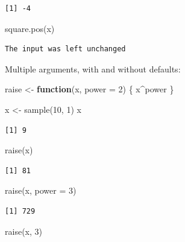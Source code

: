 \documentclass[
]{book}
\newenvironment{Shaded}{\begin{snugshade}}{\end{snugshade}}
\newcommand{\AttributeTok}[1]{\textcolor[rgb]{0.77,0.63,0.00}{#1}}
\newcommand{\ControlFlowTok}[1]{\textcolor[rgb]{0.13,0.29,0.53}{\textbf{#1}}}
\newcommand{\DecValTok}[1]{\textcolor[rgb]{0.00,0.00,0.81}{#1}}
\newcommand{\FunctionTok}[1]{\textcolor[rgb]{0.00,0.00,0.00}{#1}}
\newcommand{\NormalTok}[1]{#1}
\newcommand{\OtherTok}[1]{\textcolor[rgb]{0.56,0.35,0.01}{#1}}
\newcommand{\SpecialCharTok}[1]{\textcolor[rgb]{0.00,0.00,0.00}{#1}}
\begin{document}
\begin{verbatim}
[1] -4
\end{verbatim}

\begin{Shaded}
\begin{Highlighting}[]
\FunctionTok{square.pos}\NormalTok{(x)}
\end{Highlighting}
\end{Shaded}

\begin{verbatim}
The input was left unchanged
\end{verbatim}

Multiple arguments, with and without defaults:

\begin{Shaded}
\begin{Highlighting}[]
\NormalTok{raise }\OtherTok{\textless{}{-}} \ControlFlowTok{function}\NormalTok{(x, }\AttributeTok{power =} \DecValTok{2}\NormalTok{) \{}
\NormalTok{  x}\SpecialCharTok{\^{}}\NormalTok{power}
\NormalTok{\}}

\NormalTok{x }\OtherTok{\textless{}{-}} \FunctionTok{sample}\NormalTok{(}\DecValTok{10}\NormalTok{, }\DecValTok{1}\NormalTok{)}
\NormalTok{x}
\end{Highlighting}
\end{Shaded}

\begin{verbatim}
[1] 9
\end{verbatim}

\begin{Shaded}
\begin{Highlighting}[]
\FunctionTok{raise}\NormalTok{(x)}
\end{Highlighting}
\end{Shaded}

\begin{verbatim}
[1] 81
\end{verbatim}

\begin{Shaded}
\begin{Highlighting}[]
\FunctionTok{raise}\NormalTok{(x, }\AttributeTok{power =} \DecValTok{3}\NormalTok{)}
\end{Highlighting}
\end{Shaded}

\begin{verbatim}
[1] 729
\end{verbatim}

\begin{Shaded}
\begin{Highlighting}[]
\FunctionTok{raise}\NormalTok{(x, }\DecValTok{3}\NormalTok{)}
\end{Highlighting}
\end{Shaded}
\end{document}
